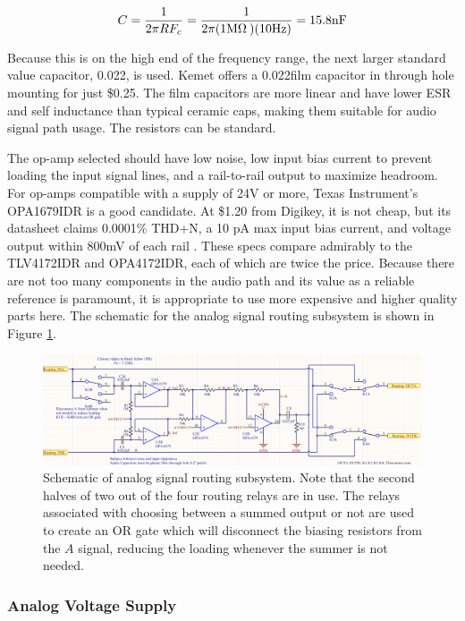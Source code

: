 	$$ C = \frac{1}{2\pi R F_c} = \frac{1}{2\pi (1 \text{M$\Omega$\:}) (10 \text{Hz})} = 15.8 \text{nF}$$

	Because this is on the high end of the frequency range, the next larger standard value capacitor, 0.022\uF, is used.  Kemet offers a 0.022\uF film capacitor in through hole mounting for just \$0.25.  The film capacitors are more linear and have lower ESR and self inductance than typical ceramic caps, making them suitable for audio signal path usage.  The resistors can be standard.

	The op-amp selected should have low noise, low input bias current to prevent loading the input signal lines, and a rail-to-rail output to maximize headroom.  For op-amps compatible with a supply of 24V or more, Texas Instrument's OPA1679IDR is a good candidate.  At \$1.20 from Digikey, it is not cheap, but its datasheet claims 0.0001\% THD+N, a 10 pA max input bias current, and voltage output within 800mV of each rail \cite{OPA1679IDRdatasheet}.  These specs compare admirably to the TLV4172IDR and OPA4172IDR, each of which are twice the price.  Because there are not too many components in the audio path and its value as a reliable reference is paramount, it is appropriate to use more expensive and higher quality parts here.  The schematic for the analog signal routing subsystem is shown in Figure \ref{fig:routingschem}.  

	\begin{figure}
		\centering
		\includegraphics[width = \textwidth]{PR4Images/RoutingSchem.PNG}
		\caption{Schematic of analog signal routing subsystem.  Note that the second halves of two out of the four routing relays are in use.  The relays associated with choosing between a summed output or not are used to create an OR gate which will disconnect the biasing resistors from the $A$ signal, reducing the loading whenever the summer is not needed.}
		\label{fig:routingschem}
	\end{figure}

	\subsubsection{Analog Voltage Supply}

